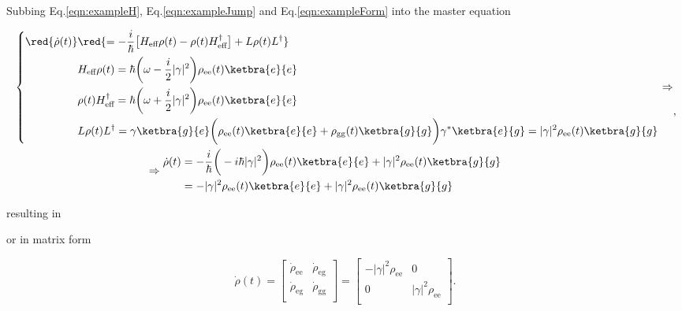 Subbing Eq.\eqref{eqn:exampleH}, Eq.\eqref{eqn:exampleJump} and Eq.\eqref{eqn:exampleForm} into the master equation

\begin{equation}
\begin{aligned}
& \left\lbrace
\begin{aligned}
\red{\dot{\rho}(t)} & \red{= -\frac{i}{\hbar}\big[H_\text{eff}\rho(t)-\rho(t)H_\text{eff}^\dagger\big] + L\rho(t)L^\dagger}\\
& H_\text{eff}\rho(t) = \hbar\bigg(\omega-\frac{i}{2}|\gamma|^2\bigg)\rho_\text{ee}(t)\ketbra{e}{e}\\
& \rho(t)H_\text{eff}^\dagger = \hbar\bigg(\omega+\frac{i}{2}|\gamma|^2\bigg)\rho_\text{ee}(t)\ketbra{e}{e}\\
& L\rho(t)L^\dagger = \gamma\ketbra{g}{e}\bigg(\rho_\text{ee}(t)\ketbra{e}{e} + \rho_\text{gg}(t)\ketbra{g}{g}\bigg)\gamma^*\ketbra{e}{g} = |\gamma|^2\rho_\text{ee}(t)\ketbra{g}{g}
\end{aligned}
\right. \Rightarrow\\
& \qquad\qquad\qquad\qquad\qquad\qquad\Rightarrow \begin{aligned}
\dot{\rho}(t) & = -\frac{i}{\hbar}\bigg(-i\hbar|\gamma|^2\bigg)\rho_\text{ee}(t)\ketbra{e}{e}+|\gamma|^2\rho_\text{ee}(t)\ketbra{g}{g}\\
& = -|\gamma|^2\rho_\text{ee}(t)\ketbra{e}{e}+|\gamma|^2\rho_\text{ee}(t)\ketbra{g}{g}
\end{aligned}
\end{aligned},
\end{equation}

\noindent resulting in


\noindent or in matrix form

\begin{equation}
\dot{\rho}(t) = 
\begin{bmatrix}
\dot{\rho}_\text{ee} & \dot{\rho}_\text{eg}\\
\dot{\rho}_\text{eg} & \dot{\rho}_\text{gg}\\
\end{bmatrix}
= 
\begin{bmatrix}
-|\gamma|^2\rho_\text{ee} & 0\\
0 & |\gamma|^2\rho_\text{ee}\\
\end{bmatrix}.
\end{equation}

